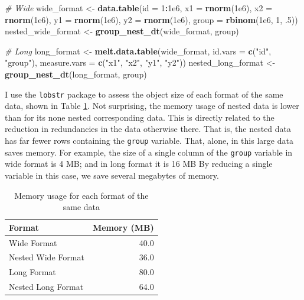 \documentclass[doc,floatsintext]{apa6}
\newenvironment{Shaded}{\begin{snugshade}}{\end{snugshade}}
\newcommand{\CommentTok}[1]{\textcolor[rgb]{0.56,0.35,0.01}{\textit{#1}}}
\newcommand{\DataTypeTok}[1]{\textcolor[rgb]{0.13,0.29,0.53}{#1}}
\newcommand{\DecValTok}[1]{\textcolor[rgb]{0.00,0.00,0.81}{#1}}
\newcommand{\FloatTok}[1]{\textcolor[rgb]{0.00,0.00,0.81}{#1}}
\newcommand{\KeywordTok}[1]{\textcolor[rgb]{0.13,0.29,0.53}{\textbf{#1}}}
\newcommand{\NormalTok}[1]{#1}
\newcommand{\OperatorTok}[1]{\textcolor[rgb]{0.81,0.36,0.00}{\textbf{#1}}}
\newcommand{\StringTok}[1]{\textcolor[rgb]{0.31,0.60,0.02}{#1}}
\begin{document}
\begin{Shaded}
\begin{Highlighting}[]
\CommentTok{# Wide}
\NormalTok{wide_format <-}\StringTok{ }\KeywordTok{data.table}\NormalTok{(}\DataTypeTok{id =} \DecValTok{1}\OperatorTok{:}\FloatTok{1e6}\NormalTok{,}
                          \DataTypeTok{x1 =} \KeywordTok{rnorm}\NormalTok{(}\FloatTok{1e6}\NormalTok{),}
                          \DataTypeTok{x2 =} \KeywordTok{rnorm}\NormalTok{(}\FloatTok{1e6}\NormalTok{),}
                          \DataTypeTok{y1 =} \KeywordTok{rnorm}\NormalTok{(}\FloatTok{1e6}\NormalTok{),}
                          \DataTypeTok{y2 =} \KeywordTok{rnorm}\NormalTok{(}\FloatTok{1e6}\NormalTok{),}
                          \DataTypeTok{group =} \KeywordTok{rbinom}\NormalTok{(}\FloatTok{1e6}\NormalTok{, }\DecValTok{1}\NormalTok{, }\FloatTok{.5}\NormalTok{))}
\NormalTok{nested_wide_format <-}\StringTok{ }\KeywordTok{group_nest_dt}\NormalTok{(wide_format, group)}

\CommentTok{# Long}
\NormalTok{long_format <-}\StringTok{ }\KeywordTok{melt.data.table}\NormalTok{(wide_format, }
                               \DataTypeTok{id.vars =} \KeywordTok{c}\NormalTok{(}\StringTok{"id"}\NormalTok{, }\StringTok{"group"}\NormalTok{),}
                               \DataTypeTok{measure.vars =} \KeywordTok{c}\NormalTok{(}\StringTok{"x1"}\NormalTok{, }\StringTok{"x2"}\NormalTok{, }\StringTok{"y1"}\NormalTok{, }\StringTok{"y2"}\NormalTok{))}
\NormalTok{nested_long_format <-}\StringTok{ }\KeywordTok{group_nest_dt}\NormalTok{(long_format, group)}
\end{Highlighting}
\end{Shaded}

I use the \texttt{lobstr} package to assess the object size of each format of the same data, shown in Table \ref{memtab}. Not surprising, the memory usage of nested data is lower than for its none nested corresponding data. This is directly related to the reduction in redundancies in the data otherwise there. That is, the nested data has far fewer rows containing the \texttt{group} variable. That, alone, in this large data saves memory. For example, the size of a single column of the \texttt{group} variable in wide format is 4 MB; and in long format it is 16 MB By reducing a single variable in this case, we save several megabytes of memory.

\begin{table}[ht]
\centering
\caption{Memory usage for each format of the same data} 
\label{memtab}
\begin{tabular}{lr}
  \toprule
Format & Memory (MB) \\ 
  \midrule
Wide Format & 40.0 \\ 
  Nested Wide Format & 36.0 \\ 
  Long Format & 80.0 \\ 
  Nested Long Format & 64.0 \\ 
   \bottomrule
\end{tabular}
\end{table}
\end{document}
